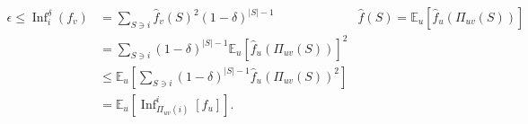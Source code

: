 \begin{remark}[Fact]
	\[
		\begin{aligned}
			\epsilon
			\leq \mathop{\mathrm{Inf}}\nolimits_i^\delta (f_v)
			 & = \sum_{S \ni i} \hat{f} _v(S)^2(1-\delta )^{\vert S \vert - 1}                                            & \hat{f} (S) = \mathbb{E}_{u}\left[\hat{f} _u(\Pi _{uv}(S)) \right] \\
			 & = \sum_{S \ni i} (1-\delta )^{\vert S \vert - 1}\mathbb{E}_{u}\left[\hat{f} _u(\Pi _{uv}(S)) \right] ^2                                                                         \\
			 & \leq \mathbb{E}_{u}\left[\sum_{S \ni i} (1-\delta )^{\vert S \vert - 1} \hat{f} _u(\Pi _{uv}(S))^2 \right]                                                                      \\
			 & = \mathbb{E}_{u}\left[\mathop{\mathrm{Inf}}\nolimits_{\Pi _{uv}(i)}^i[f_u] \right].
		\end{aligned}
	\]
\end{remark}